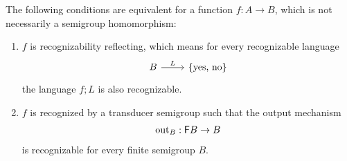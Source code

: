 \begin{theorem}\label{thm:reco-reflecting-functions}
     The following conditions are equivalent for a function $f : A \to B$, which is not necessarily a semigroup homomorphism:
    \begin{enumerate}
        \item \label{it:reco-refl} $f$ is recognizability reflecting, which means for every recognizable language 
        \[
\begin{tikzcd}
B 
\ar[r,"L"]
&
\set{\text{yes, no}}
\end{tikzcd}
\]
        the language $f;L$ is also recognizable.
        \item \label{it:trans-semig-reco}$f$ is recognized by a transducer semigroup  such that the output mechanism 
        \begin{align*}
        \mathrm{out}_B : \mathsf F B \to B
        \end{align*}
        is recognizable for every finite semigroup $B$.
    \end{enumerate}
\end{theorem}
